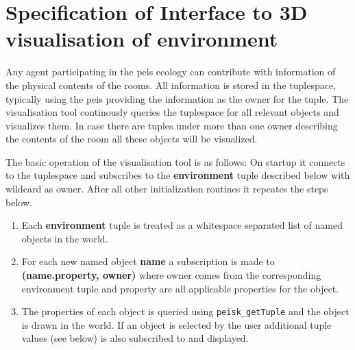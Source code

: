 \documentclass{article}
\newcommand{\tn}{\bf}
\begin{document}
\section*{Specification of Interface to 3D visualisation of environment}

Any agent participating in the peis ecology can contribute with 
information of the physical contents of the rooms. All information 
is stored in the tuplespace, typically using the peis providing the 
information as the owner for the tuple. The visualisation tool continously 
queries the tuplespace for all relevant objects and visualizes them. In 
case there are tuples under more than one owner describing the contents 
of the room all these objects will be visualized. 

\noindent
The basic operation of the visualisation tool is as follows: 
On startup it connects to the tuplespace and subscribes to the
{\tn environment} tuple described below with wildcard as owner. 
After all other initialization routines it repeates the steps below.
\begin{enumerate}
\item Each {\tn environment} tuple is treated as a whitespace separated
list of named objects in the world. 
\item For each new named object {\tn name} a subscription is made to 
{\tn (name.property, owner)} where owner comes from the corresponding
{\sc environment} tuple and property are all applicable properties for the
object.
\item The properties of each object is queried using {\tt peisk\_getTuple}
and the object is drawn in the world. If an object is selected by 
the user additional tuple values (see below) is also subscribed to and
displayed.

\end{enumerate}
\end{document}
